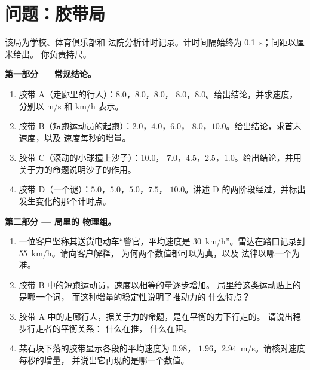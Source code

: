 \section{问题：胶带局}

\begin{problem}\label{pb:g9:uniform-varied-motion:1}
该局为学校、体育俱乐部和
法院分析计时记录。计时间隔始终为 \qty{0.1}{s}；间距以厘米给出。
你负责持尺。

\medskip\noindent\textbf{第一部分 --- 常规结论。}
\begin{enumerate}
  \item 胶带 A（走廊里的行人）：$8.0$，$8.0$，$8.0$，
        $8.0$，$8.0$。给出结论，并求速度，分别以 \unit{m/s}
        和 \unit{km/h} 表示。
  \item 胶带 B（短跑运动员的起跑）：$2.0$，$4.0$，$6.0$，
        $8.0$，$10.0$。给出结论，求首末速度，以及
        速度每秒的增量。
  \item 胶带 C（滚动的小球撞上沙子）：$10.0$，
        $7.0$，$4.5$，$2.5$，$1.0$。给出结论，并用
        关于力的命题说明沙子的作用。
  \item 胶带 D（一个谜）：$5.0$，$5.0$，$5.0$，$7.5$，
        $10.0$。讲述 D 的两阶段经过，并标出
        发生变化的那个计时点。
\end{enumerate}

\medskip\noindent\textbf{第二部分 --- 局里的
物理组。}
\begin{enumerate}[resume]
  \item 一位客户坚称其送货电动车“警官，平均速度是
        \qty{30}{km/h}”。雷达在路口记录到
        \qty{55}{km/h}。请向客户解释，
        为何两个数值都可以为真，以及
        法律以哪一个为准。
  \item 胶带 B 中的短跑运动员，速度以相等的量逐步增加。
        局里给这类运动贴上的是哪一个词，
        而这种增量的稳定性说明了推动力的
        什么特点？
  \item 胶带 A 中的走廊行人，据关于力的命题，是在平衡的力下行走的。
        请说出稳步行走者的平衡关系：
        什么在推，
        什么在阻。
  \item 某石块下落的胶带显示各段的平均速度为 $0.98$，
        $1.96$，\qty{2.94}{m/s}。请核对速度每秒的增量，
        并说出它再现的是哪一个数值。
\end{enumerate}


\end{problem}
